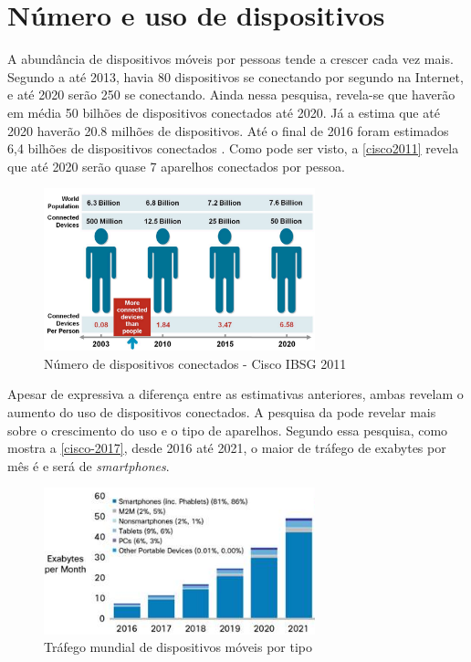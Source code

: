 \section{Número e uso de dispositivos}

A abundância de dispositivos móveis por pessoas tende a crescer cada vez mais. Segundo a  até 2013, havia 80 dispositivos
se conectando por segundo na Internet, e até 2020 serão 250 se conectando. Ainda nessa pesquisa, revela-se que haverão em média
50 bilhões de dispositivos conectados até 2020. Já a  estima que até 2020 haverão 20.8 milhões de dispositivos.
Até o final de 2016 foram estimados 6,4 bilhões de dispositivos conectados \cite{Gartner2014}. Como pode ser visto, a \autoref{cisco2011}
revela que até 2020 serão quase 7 aparelhos conectados por pessoa.

\begin{figure}[htb]
  \caption{\label{cisco2011}Número de dispositivos conectados - Cisco IBSG 2011}
  \begin{center}
    \includegraphics[width=0.70\textwidth]{img/cisco-2011.png}
  \end{center}
\end{figure}

Apesar de expressiva a diferença entre as estimativas anteriores, ambas revelam o aumento do uso de dispositivos conectados.
A pesquisa da  pode revelar mais sobre o crescimento do uso e o tipo de aparelhos. Segundo essa pesquisa,
como mostra a \autoref{cisco-2017}, desde
2016 até 2021, o maior de tráfego de exabytes por mês é e será de \emph{smartphones}.

\begin{figure}[htb]
  \caption{\label{cisco-2017}Tráfego mundial de dispositivos móveis por tipo}
  \begin{center}
    \includegraphics[width=0.70\textwidth]{img/cisco-2017.png}
  \end{center}
\end{figure}

